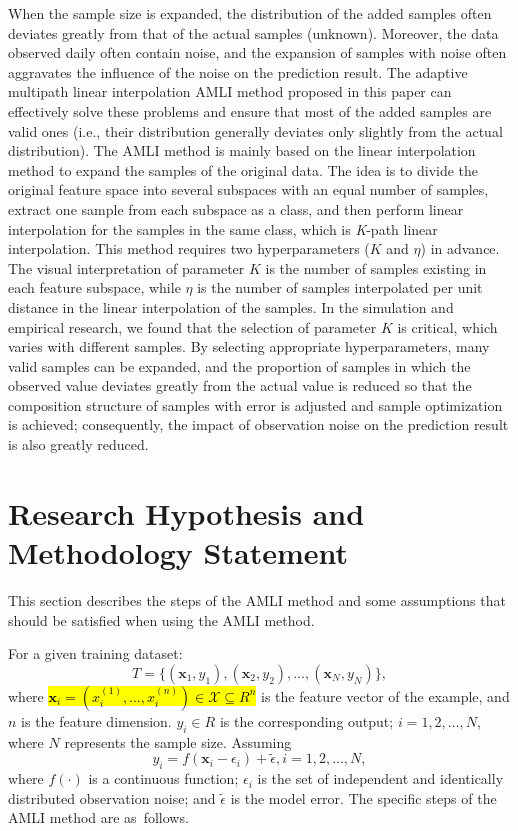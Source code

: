 \documentclass[mathematics,article,accept,pdftex,moreauthors]{Definitions/mdpi}
\begin{document}
When the sample size is expanded, the distribution of the added samples often deviates greatly from that of the actual samples (unknown). Moreover, the data observed daily often contain noise, and the expansion of samples with noise often aggravates the influence of the noise on the prediction result. The adaptive multipath linear interpolation AMLI method proposed in this paper can effectively solve these problems and ensure that most of the added samples are valid ones (i.e., their distribution generally deviates only slightly from the actual distribution). The AMLI method is mainly based on the linear interpolation method to expand the samples of the original data. The idea is to divide the original feature space into several subspaces with an equal number of samples, extract one sample from each subspace as a class, and then perform linear interpolation for the samples in the same class, which is \emph{K}-path linear interpolation. This method requires two hyperparameters ($K$ and  $\eta$) in advance. The visual interpretation of parameter $K$ is the number of samples existing in each feature subspace, while  $\eta$ is the number of samples interpolated per unit distance in the linear interpolation of the samples. In the simulation and empirical research, we found that the selection of parameter $K$ is critical, which varies with different samples. By selecting appropriate hyperparameters, many valid samples can be expanded, and the proportion of samples in which the observed value deviates greatly from the actual value is reduced so that the composition structure of samples with error is adjusted and sample optimization is  achieved; consequently, the impact of observation noise on the prediction result is also greatly reduced.




\section{ Research Hypothesis and Methodology Statement}

This section describes the steps of the AMLI method and some assumptions that should be satisfied when using the AMLI method.

For a given training dataset:
$$T=\{(\bm{x}_{1}, y_{1}), (\bm{x}_{2}, y_{2}), \ldots, (\bm{x}_{N}, y_{N})\},$$
where \hl{$\bm{x}_{i} = (x_{i}^{(1)}, \ldots, x_{i}^{(n)}) \in \mathcal{X} \subseteq R^{n} $} %
 is the feature vector of the example, and $n$ is the feature dimension. $y_{i} \in R$ is the corresponding output; $i=1,2, \dots, N$, where $N$ represents the sample size. Assuming 
$$y_{i} = f(\bm{x}_{i} - \epsilon_{i}) + \tilde{\epsilon}, i=1, 2, \ldots, N,$$
where $f(\cdot)$ is a continuous function;  $\epsilon_{i}$ is the set of independent and identically distributed observation noise; and $\tilde{\epsilon}$ is the model error. The specific steps of the AMLI method are as~follows. 
\end{document}
